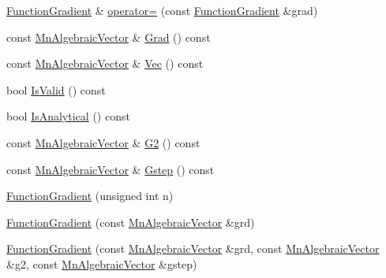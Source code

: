 \begin{DoxyCompactItemize}
\item 
\mbox{\hyperlink{classROOT_1_1Minuit2_1_1FunctionGradient}{Function\+Gradient}} \& \mbox{\hyperlink{classROOT_1_1Minuit2_1_1FunctionGradient_a0b85ff1f65dbefea4c3953898efb06ec}{operator=}} (const \mbox{\hyperlink{classROOT_1_1Minuit2_1_1FunctionGradient}{Function\+Gradient}} \&grad)
\item 
const \mbox{\hyperlink{namespaceROOT_1_1Minuit2_a62ed97730a1ca8d3fbaec64a19aa11c9}{Mn\+Algebraic\+Vector}} \& \mbox{\hyperlink{classROOT_1_1Minuit2_1_1FunctionGradient_a0effb8dbe0115928f72f122621ba4ad3}{Grad}} () const
\item 
const \mbox{\hyperlink{namespaceROOT_1_1Minuit2_a62ed97730a1ca8d3fbaec64a19aa11c9}{Mn\+Algebraic\+Vector}} \& \mbox{\hyperlink{classROOT_1_1Minuit2_1_1FunctionGradient_abdf0fd7d9e1a730049112f0c903a9f5f}{Vec}} () const
\item 
bool \mbox{\hyperlink{classROOT_1_1Minuit2_1_1FunctionGradient_a441801769f9021ade74b724584731791}{Is\+Valid}} () const
\item 
bool \mbox{\hyperlink{classROOT_1_1Minuit2_1_1FunctionGradient_a34dd6c6a7d699a149edfbb3328c525db}{Is\+Analytical}} () const
\item 
const \mbox{\hyperlink{namespaceROOT_1_1Minuit2_a62ed97730a1ca8d3fbaec64a19aa11c9}{Mn\+Algebraic\+Vector}} \& \mbox{\hyperlink{classROOT_1_1Minuit2_1_1FunctionGradient_a6f99988a7fd1a61ed96c6709f02b6041}{G2}} () const
\item 
const \mbox{\hyperlink{namespaceROOT_1_1Minuit2_a62ed97730a1ca8d3fbaec64a19aa11c9}{Mn\+Algebraic\+Vector}} \& \mbox{\hyperlink{classROOT_1_1Minuit2_1_1FunctionGradient_a09cf6f34997cef2cffca0d9ccc2b36b8}{Gstep}} () const
\item 
\mbox{\hyperlink{classROOT_1_1Minuit2_1_1FunctionGradient_ae2e6c3f8011dbe5aaf75c8e41b7de9b5}{Function\+Gradient}} (unsigned int n)
\item 
\mbox{\hyperlink{classROOT_1_1Minuit2_1_1FunctionGradient_afa8994fbd866150bd14ab53a2919c7bf}{Function\+Gradient}} (const \mbox{\hyperlink{namespaceROOT_1_1Minuit2_a62ed97730a1ca8d3fbaec64a19aa11c9}{Mn\+Algebraic\+Vector}} \&grd)
\item 
\mbox{\hyperlink{classROOT_1_1Minuit2_1_1FunctionGradient_ac9d34f0e3e55ec0e9d5e8a8bd3678b79}{Function\+Gradient}} (const \mbox{\hyperlink{namespaceROOT_1_1Minuit2_a62ed97730a1ca8d3fbaec64a19aa11c9}{Mn\+Algebraic\+Vector}} \&grd, const \mbox{\hyperlink{namespaceROOT_1_1Minuit2_a62ed97730a1ca8d3fbaec64a19aa11c9}{Mn\+Algebraic\+Vector}} \&g2, const \mbox{\hyperlink{namespaceROOT_1_1Minuit2_a62ed97730a1ca8d3fbaec64a19aa11c9}{Mn\+Algebraic\+Vector}} \&gstep)

\end{DoxyCompactItemize}
